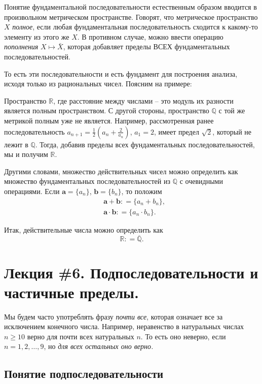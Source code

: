 Понятие фундаментальной последовательности естественным образом вводится в произвольном метрическом пространстве. Говорят, что метрическое пространство $X$ \textit{полное}, если любая фундаментальная последовательность сходится к какому-то элементу из этого же $X$. В противном случае, можно ввести операцию \textit{пополнения} $X \mapsto \bar X$, которая добавляет пределы ВСЕХ фундаментальных последовательностей. 

То есть эти последовательности и есть фундамент для построения анализа, исходя только из рациональных чисел. Поясним на примере:

Пространство $\mathbb{R}$, где расстояние между числами -- это модуль их разности является полным пространством. С другой стороны, пространство $\mathbb{Q}$ с той же метрикой полным уже не является. Например, рассмотренная ранее последовательность $a_{n+1} = \frac{1}{2}\left( a_n + \frac{2}{a_n} \right)$, $a_1 =2$, имеет предел $\sqrt{2}$, который не лежит в $\mathbb{Q}$. Тогда, добавив пределы всех фундаментальных последовательностей, мы и получим $\mathbb{R}$.

Другими словами, множество действительных чисел можно определить как множество фундаментальных последовательностей из $\mathbb{Q}$ с очевидными операциями. Если $\mathbf{a} = \{a_n\}$, $\mathbf{b} = \{b_n\}$, то положим
\begin{align*}
    & \mathbf{a} + \mathbf{b}: = \{a_n + b_n\}, \\
    & \mathbf{a} \cdot \mathbf{b}: = \{a_n \cdot b_n\}.
\end{align*}

Итак, действительные числа можно определить как
{\Huge
 \[
  \boxed{
   \boxed{
  \mathbb{R}: =  \overline{\mathbb{Q}}.
  }
  }
\]
}


\section{Лекция \#6. Подпоследовательности и частичные пределы.}

Мы будем часто употреблять фразу \textit{почти все}\label{almost_all}, которая означает все за исключением конечного числа. Например, неравенство в натуральных числах $n\ge 10$ верно для почти всех натуральных $n$. То есть оно неверно, если $n=1,2,\ldots,9$, но \textit{для всех остальных оно верно.}

\subsection{Понятие подпоследовательности}



